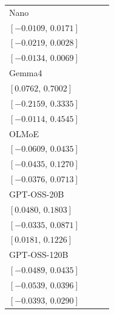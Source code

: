 \begin{tabular*}{\linewidth}{@{\extracolsep{\fill}}lccc@{}}
Nano & \begin{tabular}[t]{@{}c@{}}\(0.0032\)\\\([-0.0109,\,0.0171]\)\end{tabular} & \begin{tabular}[t]{@{}c@{}}\(-0.0094\)\\\([-0.0219,\,0.0028]\)\end{tabular} & \begin{tabular}[t]{@{}c@{}}\(-0.0031\)\\\([-0.0134,\,0.0069]\)\end{tabular}\\[2pt]
Gemma4 & \begin{tabular}[t]{@{}c@{}}\(0.3875\)\\\([0.0762,\,0.7002]\)\end{tabular} & \begin{tabular}[t]{@{}c@{}}\(0.0540\)\\\([-0.2159,\,0.3335]\)\end{tabular} & \begin{tabular}[t]{@{}c@{}}\(0.2207\)\\\([-0.0114,\,0.4545]\)\end{tabular}\\[2pt]
OLMoE & \begin{tabular}[t]{@{}c@{}}\(-0.0088\)\\\([-0.0609,\,0.0435]\)\end{tabular} & \begin{tabular}[t]{@{}c@{}}\(0.0415\)\\\([-0.0435,\,0.1270]\)\end{tabular} & \begin{tabular}[t]{@{}c@{}}\(0.0164\)\\\([-0.0376,\,0.0713]\)\end{tabular}\\[2pt]
GPT-OSS-20B & \begin{tabular}[t]{@{}c@{}}\(0.1137\)\\\([0.0480,\,0.1803]\)\end{tabular} & \begin{tabular}[t]{@{}c@{}}\(0.0262\)\\\([-0.0335,\,0.0871]\)\end{tabular} & \begin{tabular}[t]{@{}c@{}}\(0.0699\)\\\([0.0181,\,0.1226]\)\end{tabular}\\[2pt]
GPT-OSS-120B & \begin{tabular}[t]{@{}c@{}}\(-0.0032\)\\\([-0.0489,\,0.0435]\)\end{tabular} & \begin{tabular}[t]{@{}c@{}}\(-0.0071\)\\\([-0.0539,\,0.0396]\)\end{tabular} & \begin{tabular}[t]{@{}c@{}}\(-0.0051\)\\\([-0.0393,\,0.0290]\)\end{tabular}\\[2pt]
\bottomrule
\end{tabular*}%
\endgroup%
